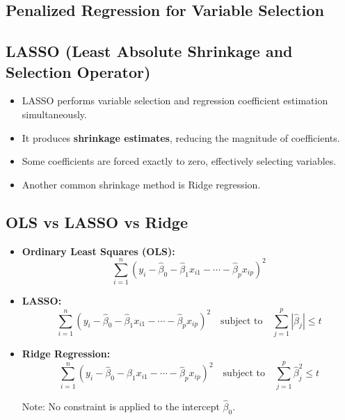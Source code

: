 \subsection{Penalized Regression for Variable Selection}

\subsection{LASSO (Least Absolute Shrinkage and Selection Operator)}

\begin{notebox}
\begin{itemize}
\item LASSO performs variable selection and regression coefficient estimation simultaneously.

\item It produces \textbf{shrinkage estimates}, reducing the magnitude of coefficients.

\item Some coefficients are forced exactly to zero, effectively selecting variables.

\item Another common shrinkage method is Ridge regression.
\end{itemize}
\end{notebox}

\subsection{OLS vs LASSO vs Ridge}

\begin{keyresult}
\begin{itemize}
\item \textbf{Ordinary Least Squares (OLS):}
\[
\sum_{i=1}^{n} \left(y_i - \hat{\beta}_0 - \hat{\beta}_1 x_{i1} - \cdots - \hat{\beta}_p x_{ip} \right)^2
\]

\item \textbf{LASSO:}
\[
\sum_{i=1}^{n} \left(y_i - \hat{\beta}_0 - \hat{\beta}_1 x_{i1} - \cdots - \hat{\beta}_p x_{ip} \right)^2
\quad \text{subject to} \quad
\sum_{j=1}^{p} |\hat{\beta}_j| \le t
\]

\item \textbf{Ridge Regression:}
\[
\sum_{i=1}^{n} \left(y_i - \hat{\beta}_0 - \hat{\beta}_1 x_{i1} - \cdots - \hat{\beta}_p x_{ip} \right)^2
\quad \text{subject to} \quad
\sum_{j=1}^{p} \hat{\beta}_j^2 \le t
\]

Note: No constraint is applied to the intercept $\hat{\beta}_0$.
\end{itemize}
\end{keyresult}

